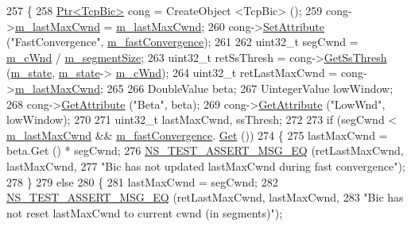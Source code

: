 \begin{DoxyCode}
257 \{
258   \hyperlink{classns3_1_1Ptr}{Ptr<TcpBic>} cong = CreateObject <TcpBic> ();
259   cong->\hyperlink{classns3_1_1TcpBic_a082025c05e83dcddab77a6e3209cd4eb}{m\_lastMaxCwnd} = \hyperlink{classTcpBicDecrementTest_a821e60a1b65ae88f0659eaa45225ca1b}{m\_lastMaxCwnd};
260   cong->\hyperlink{classns3_1_1ObjectBase_ac60245d3ea4123bbc9b1d391f1f6592f}{SetAttribute} (\textcolor{stringliteral}{"FastConvergence"}, \hyperlink{classTcpBicDecrementTest_ab7843c294958bc856516bd2713edce99}{m\_fastConvergence});
261 
262   uint32\_t segCwnd = \hyperlink{classTcpBicDecrementTest_a1facb1a7596141c8a5e49af8ebad7261}{m\_cWnd} / \hyperlink{classTcpBicDecrementTest_a6430400f92d1bcb3832692cdb4936475}{m\_segmentSize};
263   uint32\_t retSsThresh = cong->\hyperlink{classns3_1_1TcpBic_aaec211ef4f1624860911aaf544ac9650}{GetSsThresh} (\hyperlink{classTcpBicDecrementTest_a917e5a2c5da454fc06ee7d5be6814d47}{m\_state}, \hyperlink{classTcpBicDecrementTest_a917e5a2c5da454fc06ee7d5be6814d47}{m\_state}->
      \hyperlink{classns3_1_1TcpSocketState_a7cd3d2156a483c1db436097477a0fd7f}{m\_cWnd});
264   uint32\_t retLastMaxCwnd = cong->\hyperlink{classns3_1_1TcpBic_a082025c05e83dcddab77a6e3209cd4eb}{m\_lastMaxCwnd};
265 
266   DoubleValue beta;
267   UintegerValue lowWindow;
268   cong->\hyperlink{classns3_1_1ObjectBase_a895d1de2f96063d0e0fd78463e7a7e30}{GetAttribute} (\textcolor{stringliteral}{"Beta"}, beta);
269   cong->\hyperlink{classns3_1_1ObjectBase_a895d1de2f96063d0e0fd78463e7a7e30}{GetAttribute} (\textcolor{stringliteral}{"LowWnd"}, lowWindow);
270 
271   uint32\_t lastMaxCwnd, ssThresh;
272 
273   \textcolor{keywordflow}{if} (segCwnd < \hyperlink{classTcpBicDecrementTest_a821e60a1b65ae88f0659eaa45225ca1b}{m\_lastMaxCwnd} && \hyperlink{classTcpBicDecrementTest_ab7843c294958bc856516bd2713edce99}{m\_fastConvergence}.
      \hyperlink{classns3_1_1BooleanValue_a15d5d96abfd11676964f40859442ec12}{Get} ())
274     \{
275       lastMaxCwnd = beta.Get () * segCwnd;
276       \hyperlink{group__testing_ga2a9d78cffb3db8e867c35fff0b698cf5}{NS\_TEST\_ASSERT\_MSG\_EQ} (retLastMaxCwnd, lastMaxCwnd,
277                              \textcolor{stringliteral}{"Bic has not updated lastMaxCwnd during fast convergence"});
278     \}
279   \textcolor{keywordflow}{else}
280     \{
281       lastMaxCwnd = segCwnd;
282       \hyperlink{group__testing_ga2a9d78cffb3db8e867c35fff0b698cf5}{NS\_TEST\_ASSERT\_MSG\_EQ} (retLastMaxCwnd, lastMaxCwnd,
283                              \textcolor{stringliteral}{"Bic has not reset lastMaxCwnd to current cwnd (in segments)"});

\end{DoxyCode}
